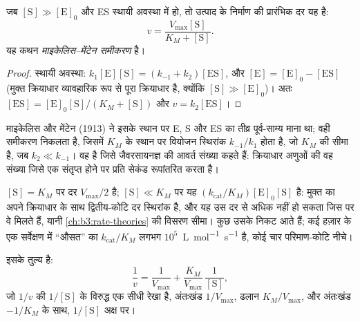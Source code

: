 \begin{theorem}[माइकेलिस--मेंटेन समीकरण]\label{thm:b3:complex-kinetics:michaelis-menten}
जब $[\mathrm S] \gg [\mathrm E]_0$ और ES स्थायी अवस्था में हो, तो उत्पाद के निर्माण की
प्रारंभिक दर यह है:
\[
  v = \frac{V_{\max}[\mathrm S]}{K_M + [\mathrm S]} .
\]
यह कथन \emph{माइकेलिस--मेंटेन समीकरण} है।
\end{theorem}

\begin{proof}
स्थायी अवस्था: $k_1[\mathrm E][\mathrm S] = (k_{-1} + k_2)[\mathrm{ES}]$, और $[\mathrm E] = [\mathrm E]_0 - [\mathrm{ES}]$ (मुक्त
क्रियाधार व्यावहारिक रूप से पूरा क्रियाधार है, क्योंकि $[\mathrm S] \gg [\mathrm E]_0$)। अतः $[\mathrm{ES}]
= [\mathrm E]_0[\mathrm S]/(K_M + [\mathrm S])$ और $v = k_2[\mathrm{ES}]$।
\end{proof}

\begin{remark}
माइकेलिस और मेंटेन (1913) ने इसके स्थान पर E, S और
ES का तीव्र पूर्व-साम्य माना था; वही समीकरण निकलता है, जिसमें $K_M$ के स्थान पर वियोजन स्थिरांक
$k_{-1}/k_1$ होता है, जो $K_M$ की सीमा है, जब $k_2 \ll k_{-1}$।  वह है
जिसे जैवरसायनज्ञ  की आवर्त संख्या कहते हैं: क्रियाधार
अणुओं की वह संख्या जिसे एक  संतृप्त होने पर प्रति सेकंड रूपांतरित करता है।
\end{remark}

$[\mathrm S] = K_M$ पर दर $V_{\max}/2$ है; $[\mathrm S] \ll K_M$ पर यह $(k_{\mathrm{cat}}/K_M)[\mathrm E]_0[\mathrm S]$ है:
 मुक्त  का अपने क्रियाधार के साथ द्वितीय-कोटि दर स्थिरांक है,
और यह उस दर से अधिक नहीं हो सकता जिस पर वे मिलते हैं, यानी
\cref{ch:b3:rate-theories} की विसरण सीमा। कुछ  उसके निकट आते हैं;
कई हज़ार  के एक सर्वेक्षण में ``औसत''  का $k_{\mathrm{cat}}/K_M$ लगभग
$10^5$~\unit{L.mol^{-1}.s^{-1}} है, कोई चार परिमाण-कोटि नीचे।

\begin{proposition}[लाइनवीवर--बर्क रूप]\label{prop:b3:complex-kinetics:lineweaver}
 इसके तुल्य है:
\[
  \frac1v = \frac{1}{V_{\max}} + \frac{K_M}{V_{\max}}\,\frac{1}{[\mathrm S]},
\]
जो $1/v$ की $1/[\mathrm S]$ के विरुद्ध एक सीधी रेखा है, अंतःखंड $1/V_{\max}$, ढलान $K_M/V_{\max}$, और
अंतःखंड $-1/K_M$ के साथ, $1/[\mathrm S]$ अक्ष पर।
\end{proposition}

